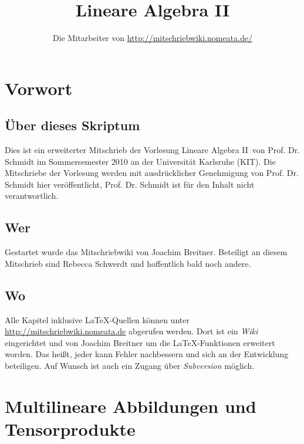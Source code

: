 \documentclass[parskip,a4paper,twoside,DIV15,BCOR12mm]{scrbook}
\author{Die Mitarbeiter von \url{http://mitschriebwiki.nomeata.de/}}
\title{Lineare Algebra II}
\begin{document}
\maketitle

\renewcommand{\thechapter}{\Roman{chapter}}

\tableofcontents

\chapter{Vorwort}

\section{Über dieses Skriptum}
Dies ist ein erweiterter Mitschrieb der Vorlesung \glqq Lineare Algebra II\grqq\ von Prof. Dr. Schmidt im
Sommersemester 2010 an der Universität Karlsruhe (KIT). Die Mitschriebe der Vorlesung werden mit
ausdrücklicher Genehmigung von Prof. Dr. Schmidt hier veröffentlicht, Prof. Dr. Schmidt ist für den
Inhalt nicht verantwortlich.

\section{Wer}
Gestartet wurde das Mitschriebwiki von Joachim Breitner. Beteiligt an diesem Mitschrieb sind
Rebecca Schwerdt und hoffentlich bald noch andere.

\section{Wo}
Alle Kapitel inklusive \LaTeX-Quellen können unter \url{http://mitschriebwiki.nomeata.de} abgerufen werden.
Dort ist ein \emph{Wiki} eingerichtet und von Joachim Breitner um die \LaTeX-Funktionen erweitert worden.
Das heißt, jeder kann Fehler nachbessern und sich an der Entwicklung
beteiligen. Auf Wunsch ist auch ein Zugang über \emph{Subversion} möglich.


\renewcommand{\thechapter}{\arabic{chapter}}
\renewcommand{\chaptername}{§}
\setcounter{chapter}{14}

\chapter{Multilineare Abbildungen und Tensorprodukte}
\end{document}

